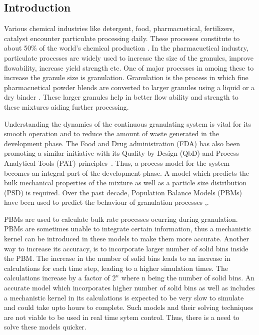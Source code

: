 \documentclass[preprint,10pt,authoryear]{elsarticle}
\begin{document}
\begin{linenumbers}
\section{Introduction}
\label{secIntro}
Various chemical industries like detergent, food, pharmacuetical, fertilizers, 
catalyst encounter particulate processing daily. These processes 
constitute to about 50\% of the world's chemical production \citep{seville1997}. 
In the pharmacuetical industry, particulate processes are widely used to increase 
the size of the granules, improve flowability, increase yield strength etc. One of 
major processes in amoing these to increase the granule size is granulation. 
Granulation is the process in which fine pharmacuetical powder 
blends are converted to larger granules using a liquid or a dry binder \citep{Chaturbedi2017}. 
These larger granules help in better flow ability and strength to these mixtures 
aiding further processing. 


Understanding the dynamics of the continuous granulating system is vital for its smooth 
operation and to reduce the amount of waste generated in the development phase. The Food 
and Drug administration (FDA) has also been promoting a similar initiative with its 
Quality by Design (QbD) and Process Analytical Tools (PAT) principles~\citep{sen2014}. 
Thus, a process model for the system becomes an integral part of the development phase. 
A model which predicts the bulk mechanical properties of the mixture as well as a particle size 
distribution (PSD) is required. Over the past decade, Population Balance Models (PBMs) have been used 
to predict the behaviour of granulation processes \citep{Barrasso2013},\citep{Ramachandran2009}. 

PBMs are used to calculate bulk rate processes ocurring during granulation. PBMs are sometimes 
unable to integrate certain information, thus a mechanistic kernel can be 
introduced in these models to make them more accurate. Another way to increase its accuracy, 
is to incorporate larger number of solid bins inside the PBM. The increase in the number of 
solid bins leads to an increase in calculations for each time step, leading to a higher 
simulation times. The calculations increase by a factor of $2^n$ where n being the number 
of solid bins. An accurate model which incorporates higher number of solid bins as well as 
includes a mechanistic kernel in its calculations is expected to be very 
slow to simulate and could take upto hours to complete. Such models and their solving 
techniques are not viable to be used in real time sytem control. Thus, there is a need to 
solve these models quicker.


\end{linenumbers}
\end{document}

